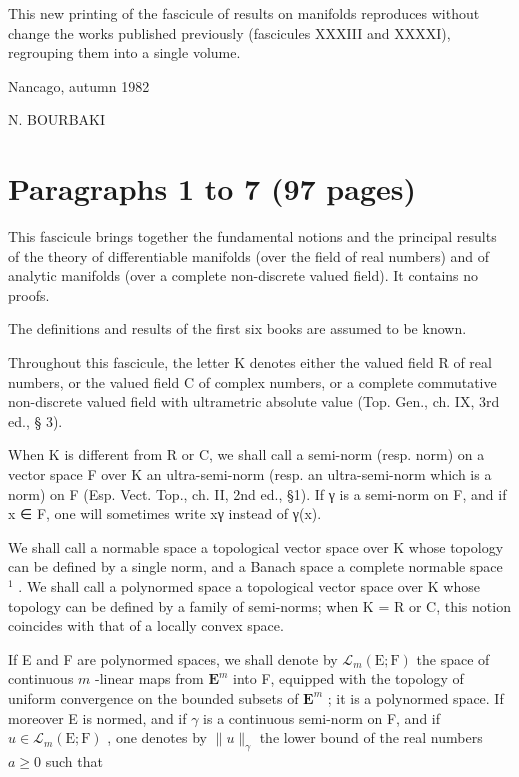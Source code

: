 
This new printing of the fascicule of results on manifolds reproduces without change the works published previously (fascicules XXXIII and XXXXI), regrouping them into a single volume.

Nancago, autumn 1982

N. BOURBAKI

\part{Paragraphs 1 to 7 (97 pages)}


This fascicule brings together the fundamental notions and the principal results of the theory of differentiable manifolds (over the field of real numbers) and of analytic manifolds (over a complete non-discrete valued field). It contains no proofs.

The definitions and results of the first six books are assumed to be known.



Throughout this fascicule, the letter K denotes either the valued field R of real numbers, or the valued field C of complex numbers, or a complete commutative non-discrete valued field with ultrametric absolute value (Top. Gen., ch. IX, 3rd ed., § 3).


When K is different from R or C, we shall call a semi-norm (resp. norm) on a vector space F over K an ultra-semi-norm (resp. an ultra-semi-norm which is a norm) on F (Esp. Vect. Top., ch. II, 2nd ed., §1). If γ is a semi-norm on F, and if x ∈ F, one will sometimes write \textbar\textbar x\textbar\textbar γ instead of γ(x).

We shall call a normable space a topological vector space over K whose topology can be defined by a single norm, and a Banach space a complete normable space \(^{1}\) . We shall call a polynormed space a topological vector space over K whose topology can be defined by a family of semi-norms; when K = R or C, this notion coincides with that of a locally convex space.

If E and F are polynormed spaces, we shall denote by \(\mathcal{L}_{m}(\mathrm{E};\mathrm{F})\) the space of continuous \(m\) -linear maps from \(\mathbf{E}^{m}\) into F, equipped with the topology of uniform convergence on the bounded subsets of \(\mathbf{E}^{m}\) ; it is a polynormed space. If moreover E is normed, and if \(\gamma\) is a continuous semi-norm on F, and if \(u\in\mathcal{L}_{m}(\mathrm{E};\mathrm{F})\) , one denotes by \(\|u\|_{\gamma}\) the lower bound of the real numbers \(a\geqslant0\) such that

